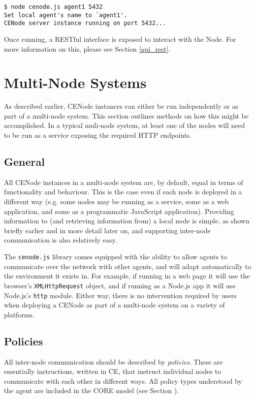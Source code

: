 \documentclass{scrartcl}
\begin{document}
\begin{verbatim}
$ node cenode.js agent1 5432
Set local agent's name to `agent1'.
CENode server instance running on port 5432...
\end{verbatim}

Once running, a RESTful interface is exposed to interact with the Node. For more information on this, please see Section \ref{api_rest}.

\section{Multi-Node Systems}
As described earlier, CENode instances can either be run independently or as part of a multi-node system. This section outlines methods on how this might be accomplished. In a typical muli-node system, at least one of the nodes will need to be run as a service exposing the required HTTP endpoints.

\subsection{General}
All CENode instances in a multi-node system are, by default, equal in terms of functionality and behaviour. This is the case even if each node is deployed in a different way (e.g. some nodes may be running as a service, some as a web application, and some as a programmatic JavaScript application). Providing information to (and retrieving information from) a local node is simple, as shown briefly earlier and in more detail later on, and supporting inter-node communication is also relatively easy.

The \texttt{cenode.js} library comes equipped with the ability to allow agents to communicate over the network with other agents, and will adapt automatically to the environment it exists in. For example, if running in a web page it will use the browser's \texttt{XMLHttpRequest} object, and if running as a Node.js app it will use Node.js's \texttt{http} module. Either way, there is no intervention required by users when deploying a CENode as part of a multi-node system on a variety of platforms.


\subsection{Policies}
All inter-node communication should be described by \textit{policies}. These are essentially instructions, written in CE, that instruct individual nodes to communicate with each other in different ways. All policy types understood by the agent are included in the CORE model (see Section \label{models}).\\
\end{document}
